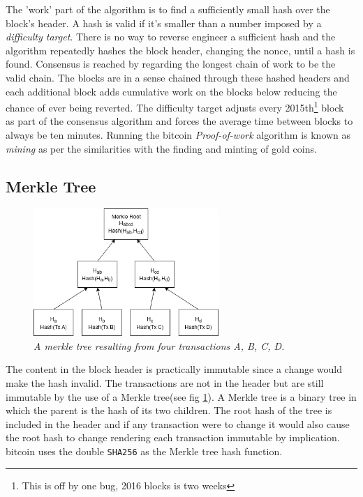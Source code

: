 The 'work' part of the algorithm is to find a sufficiently small hash over the block's header. A hash is valid if it's smaller than a number imposed by a \textit{difficulty target}. There is no way to reverse engineer a sufficient hash and the algorithm repeatedly hashes the block header, changing the nonce, until a hash is found. Consensus is reached by regarding the longest chain of work to be the valid chain. The blocks are in a sense chained through these hashed headers and each additional block adds cumulative work on the blocks below reducing the chance of ever being reverted. The difficulty target adjusts every 2015th\footnote{This is off by one bug, 2016 blocks is two weeks} block~\cite{repository:bitcoin} as part of the consensus algorithm and forces the average time between blocks to always be ten minutes. Running the bitcoin \textit{Proof-of-work} algorithm is known as \textit{mining} as per the similarities with the finding and minting of gold coins.

\subsection{Merkle Tree}

\begin{figure}[!htb]
	
	\centering
	\includegraphics[width=7cm]{images/merkle.png}
	\caption{\textit{A merkle tree resulting from four transactions A, B, C, D.
	}}
	\label{fig:merkle:tree}
	
\end{figure}

The content in the block header is practically immutable since a change would make the \gls{hash} invalid. The transactions are not in the header but are still immutable by the use of a Merkle tree(see fig \ref{fig:merkle:tree}). A Merkle tree is a binary tree in which the parent is the hash of its two children. The root hash of the tree is included in the header and if any transaction were to change it would also cause the root hash to change rendering each transaction immutable by implication. \gls{bitcoin} uses the double \texttt{SHA256} as the Merkle tree hash function.

